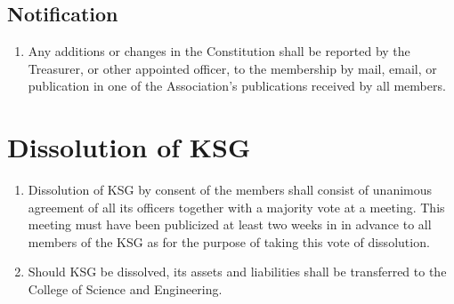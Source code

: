 \documentclass[12pt,letterpaper]{article}
\begin{document}
\subsection{Notification}
\begin{enumerate}
  \item Any additions or changes in the Constitution shall be reported by the Treasurer,
        or other appointed officer, to the membership by mail, email, or publication in
        one of the Association's publications received by all members.
\end{enumerate}

\section{Dissolution of KSG}
\begin{enumerate}
  \item Dissolution of KSG by consent of the members shall consist of unanimous
        agreement of all its officers together with a majority vote at a meeting.
        This meeting must have been publicized at least two weeks in in advance
        to all members of the KSG as for the purpose of taking this vote of
        dissolution.
  \item Should KSG be dissolved, its assets and liabilities shall be
        transferred to the College of Science and Engineering.
\end{enumerate}
\end{document}
